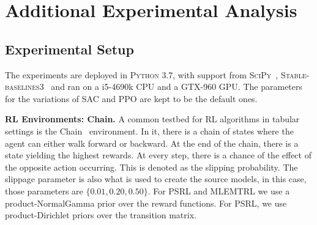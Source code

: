 \clearpage
\section{Additional Experimental Analysis}

\subsection{Experimental Setup}\label{sec:rl_env}
The experiments are deployed in \textsc{Python 3.7}, with support from \textsc{SciPy}~\citep{virtanen2020scipy}, \textsc{Stable-baselines3}~\citep{raffin2021stable} and ran on a i5-4690k CPU and a GTX-960 GPU. The parameters for the variations of SAC and PPO are kept to be the default ones.

\noindent\textbf{RL Environments: Chain.} A common testbed for RL algorithms in tabular settings is the Chain~\citep{dearden1998bayesian} environment. In it, there is a chain of states where the agent can either walk forward or backward. At the end of the chain, there is a state yielding the highest rewards. At every step, there is a chance of the effect of the opposite action occurring. This is denoted as the slipping probability. The slippage parameter is also what is used to create the source models, in this case, those parameters are $\{0.01, 0.20, 0.50\}$. 
For PSRL and MLEMTRL we use a product-NormalGamma prior over the reward functions. For PSRL, we use product-Dirichlet priors over the transition matrix.


